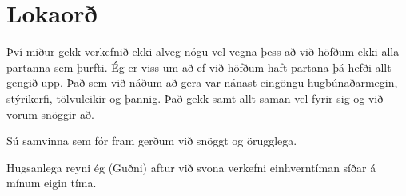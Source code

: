 \section{Lokaorð}


Því miður gekk verkefnið ekki alveg nógu vel vegna þess að við höfðum ekki alla partanna sem þurfti. Ég er viss um að ef við höfðum haft partana þá hefði allt gengið upp. Það sem við náðum að gera var nánast eingöngu hugbúnaðarmegin, stýrikerfi, tölvuleikir og þannig. Það gekk samt allt saman vel fyrir sig og við vorum snöggir að.

Sú samvinna sem fór fram gerðum við snöggt og örugglega.

Hugsanlega reyni ég (Guðni) aftur við svona verkefni einhverntíman síðar á mínum eigin tíma.
